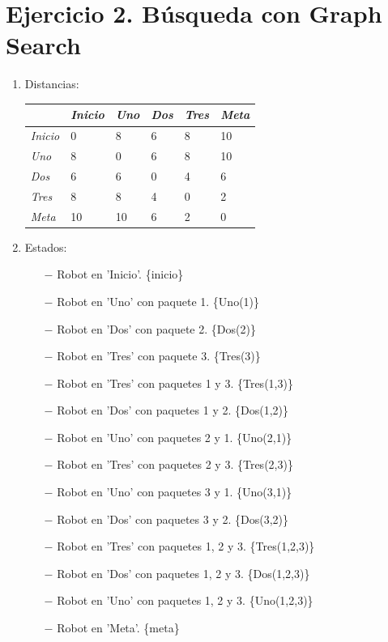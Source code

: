 \documentclass{article}
\begin{document}
\section{Ejercicio 2. Búsqueda con Graph Search}
\begin{enumerate}
    \setlength\itemsep{2em}
    \item 
        Distancias:
        
        \bigskip
        \begin{tabular}{l|l|l|l|l|l}
            \hline
                            & \textit{Inicio} & \textit{Uno} & \textit{Dos} & \textit{Tres} & \textit{Meta} \\ \hline
            \textit{Inicio} & 0               & 8            & 6            & 8             & 10            \\ \hline
            \textit{Uno}    & 8               & 0            & 6            & 8             & 10            \\ \hline
            \textit{Dos}    & 6               & 6            & 0            & 4             & 6             \\ \hline
            \textit{Tres}   & 8               & 8            & 4            & 0             & 2             \\ \hline
            \textit{Meta}   & 10              & 10           & 6            & 2             & 0             \\ \hline
        \end{tabular}
        
    \item
        Estados:
        \begin{itemize}
            \item[$-$]  Robot en 'Inicio'. \{inicio\}
            \item[$-$]  Robot en 'Uno' con paquete 1. \{Uno(1)\}
            \item[$-$]  Robot en 'Dos' con paquete 2. \{Dos(2)\}
            \item[$-$]  Robot en 'Tres' con paquete 3. \{Tres(3)\}
            \item[$-$]  Robot en 'Tres' con paquetes 1 y 3. \{Tres(1,3)\}
            \item[$-$]  Robot en 'Dos' con paquetes 1 y 2. \{Dos(1,2)\} 
            \item[$-$]  Robot en 'Uno' con paquetes 2 y 1. \{Uno(2,1)\}
            \item[$-$]  Robot en 'Tres' con paquetes 2 y 3. \{Tres(2,3)\}
            \item[$-$]  Robot en 'Uno' con paquetes 3 y 1. \{Uno(3,1)\}
            \item[$-$]  Robot en 'Dos' con paquetes 3 y 2. \{Dos(3,2)\}
            \item[$-$]  Robot en 'Tres' con paquetes 1, 2 y 3. \{Tres(1,2,3)\}
            \item[$-$]  Robot en 'Dos' con paquetes 1, 2 y 3. \{Dos(1,2,3)\}
            \item[$-$]  Robot en 'Uno' con paquetes 1, 2 y 3. \{Uno(1,2,3)\}
            \item[$-$]  Robot en 'Meta'. \{meta\}
        \end{itemize}
        

\end{enumerate}
\end{document}
